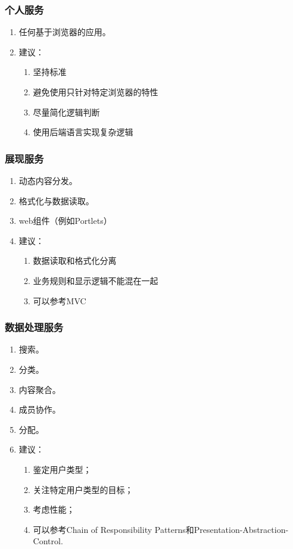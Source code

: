 \subsubsection{个人服务}
\begin{enumerate}
   \item 任何基于浏览器的应用。
   \item 建议：
       \begin{enumerate}[label=(\arabic*)]
       \item 坚持标准
       \item 避免使用只针对特定浏览器的特性
       \item 尽量简化逻辑判断
       \item 使用后端语言实现复杂逻辑
     \end{enumerate}
\end{enumerate}

\subsubsection{展现服务}
\begin{enumerate}
   \item 动态内容分发。
   \item 格式化与数据读取。
   \item web组件（例如Portlets）
   \item 建议：
       \begin{enumerate}[label=(\arabic*)]
       \item 数据读取和格式化分离
       \item 业务规则和显示逻辑不能混在一起
       \item 可以参考MVC
     \end{enumerate}
\end{enumerate}

\subsubsection{数据处理服务}
\begin{enumerate}
   \item 搜索。
   \item 分类。
   \item 内容聚合。
   \item 成员协作。
   \item 分配。
   \item 建议：
       \begin{enumerate}[label=(\arabic*)]
       \item 鉴定用户类型；
       \item 关注特定用户类型的目标；
       \item 考虑性能；
       \item 可以参考Chain of Responsibility Patterns和Presentation-Abstraction-Control.
     \end{enumerate}
\end{enumerate}

